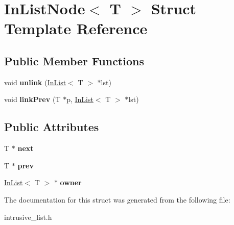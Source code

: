 \hypertarget{structInListNode}{\section{In\-List\-Node$<$ T $>$ Struct Template Reference}
\label{structInListNode}
}
\subsection*{Public Member Functions}
\begin{DoxyCompactItemize}
\item 
\hypertarget{structInListNode_a12c5300cc44a7d5358566fa7349c68bf}{void {\bfseries unlink} (\hyperlink{classInList}{In\-List}$<$ T $>$ $\ast$lst)}\label{structInListNode_a12c5300cc44a7d5358566fa7349c68bf}

\item 
\hypertarget{structInListNode_a76c4eacdbb651822ff9c9caba0600082}{void {\bfseries link\-Prev} (T $\ast$p, \hyperlink{classInList}{In\-List}$<$ T $>$ $\ast$lst)}\label{structInListNode_a76c4eacdbb651822ff9c9caba0600082}

\end{DoxyCompactItemize}
\subsection*{Public Attributes}
\begin{DoxyCompactItemize}
\item 
\hypertarget{structInListNode_a285cb71fd2e8dd4055a1d4a618e38032}{T $\ast$ {\bfseries next}}\label{structInListNode_a285cb71fd2e8dd4055a1d4a618e38032}

\item 
\hypertarget{structInListNode_a7d4032af2712b5d542ffa9d800c98a55}{T $\ast$ {\bfseries prev}}\label{structInListNode_a7d4032af2712b5d542ffa9d800c98a55}

\item 
\hypertarget{structInListNode_aa62a10f3d82fc1cdfc0315cab9d674a9}{\hyperlink{classInList}{In\-List}$<$ T $>$ $\ast$ {\bfseries owner}}\label{structInListNode_aa62a10f3d82fc1cdfc0315cab9d674a9}

\end{DoxyCompactItemize}


The documentation for this struct was generated from the following file\-:\begin{DoxyCompactItemize}
\item 
intrusive\-\_\-list.\-h\end{DoxyCompactItemize}
